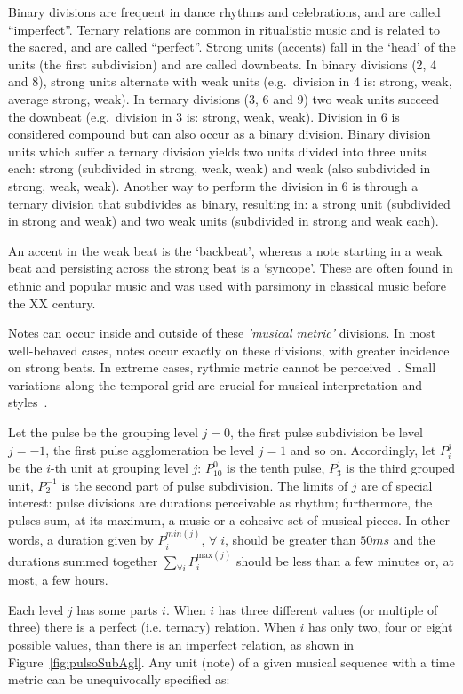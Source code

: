 Binary divisions are frequent in dance rhythms and celebrations, and are called ``imperfect''. Ternary relations are common in
ritualistic music and is related to the sacred, and are called ``perfect''. Strong units (accents) fall in the `head' of the units (the first subdivision) and are called downbeats. In binary divisions (2, 4
and 8), strong units alternate with weak units
(e.g.\ division in 4 is: strong, weak, average strong, weak). In ternary divisions
(3, 6 and 9) two weak units succeed the downbeat (e.g.\ division in 3 is:
strong, weak, weak). Division in 6 is considered compound but can also
occur as a binary division. Binary division units which suffer a ternary division yields two units divided into three units each: strong (subdivided in strong,
weak, weak) and weak (also subdivided in strong, weak, weak). Another way to perform
the division in 6 is through a ternary division that subdivides as binary,
resulting in: a strong unit (subdivided in strong and weak) and two weak units
(subdivided in strong and weak each).

An accent in the weak beat is the `backbeat', whereas a note starting in a weak beat and persisting across the strong beat is a `syncope'.
These are often found in ethnic and popular music and was used with parsimony in classical music before the XX century.

Notes can occur inside and outside of these \emph{'musical metric'} divisions. In most well-behaved cases, notes occur exactly on these divisions, with greater incidence on strong beats.
In extreme cases, rythmic metric cannot be perceived~\cite{Roederer}. 
Small variations along the temporal grid are crucial for musical interpretation and
styles~\cite{Cook}.

Let the pulse be the grouping level $j=0$, the first pulse subdivision be level $j=-1$,
the first pulse agglomeration be level $j=1$ and so on. Accordingly, let $P_i^j$ be the $i$-th unit at grouping level $j$: $P^0_{10}$ is the tenth pulse, $P^{1}_3$ is the third grouped unit,
$P^{-1}_2$ is the second part of pulse subdivision. The limits of $j$ are of special interest: pulse divisions are durations perceivable as rhythm; furthermore, the pulses sum, at its maximum, a music or a cohesive set of musical pieces. In other words, a duration given
by $P^{min(j)}_i$, $\forall \; i$, should be greater than $50 ms$ and the durations
summed together $\sum_{\forall i}P^{\text{max}(j)}_i$ should be less than a few
minutes or, at most, a few hours.

Each level $j$ has some parts $i$. When $i$ has three different
values (or multiple of three) there is a perfect (i.e. ternary) relation. When $i$ has only
two, four or eight possible values, than there is an imperfect relation,
as shown in Figure~\ref{fig:pulsoSubAgl}. Any unit (note) of a given musical sequence with a time metric can be unequivocally
specified as:

